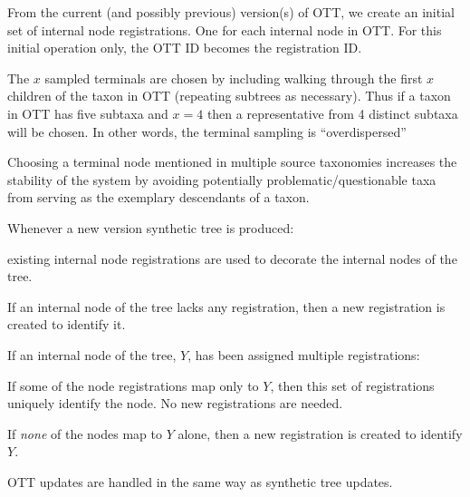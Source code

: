 \documentclass[11pt]{article}
\begin{document}
\begin{compactenum}
  \item From the current (and possibly previous) version(s) of OTT,
  we create an initial set of internal node registrations.
  One for each internal node in OTT.
  For this initial operation only, the OTT ID becomes the registration ID.
  \begin{compactitem}
    \item The $x$ sampled terminals are chosen by including walking through the first $x$ 
    children of the taxon in OTT (repeating subtrees as necessary).
    Thus if a taxon in OTT has five subtaxa and $x=4$ then a representative from
    4 distinct subtaxa will be chosen.
    In other words, the terminal sampling is ``overdispersed''
    \item Choosing a terminal node mentioned in multiple source taxonomies increases
    the stability of the system by avoiding potentially problematic/questionable
    taxa from serving as the exemplary descendants of a taxon.
  \end{compactitem}
  \item Whenever a new version synthetic tree is produced:
    \begin{compactenum}
      \item existing internal node registrations are used to decorate the
      internal nodes of the tree.
      \item If an internal node of the tree lacks any registration, then a new registration is
      created to identify it.
      \item If an internal node of the tree, $Y$, has been assigned multiple registrations:
      \begin{compactenum}
        \item If some of the node registrations map only to $Y$, then this set
          of registrations uniquely identify the node. No new registrations are
          needed.
        \item If {\em none} of the nodes map to $Y$ alone, then a new
        registration is created to identify $Y$.
      \end{compactenum}
    \end{compactenum}
  \item OTT updates are handled in the same way as synthetic tree updates.
\end{compactenum}
\end{document}
